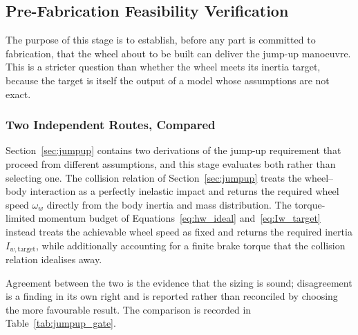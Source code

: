 \subsection{Pre-Fabrication Feasibility Verification}
\label{sec:test_feasibility}

The purpose of this stage is to establish, before any part is committed to
fabrication, that the wheel about to be built can deliver the jump-up manoeuvre.
This is a stricter question than whether the wheel meets its inertia target,
because the target is itself the output of a model whose assumptions are not
exact.

\subsubsection{Two Independent Routes, Compared}

Section~\ref{sec:jumpup} contains two derivations of the jump-up requirement that
proceed from different assumptions, and this stage evaluates both rather than
selecting one. The collision relation of Section~\ref{sec:jumpup} treats the
wheel--body interaction as a perfectly inelastic impact and returns the required
wheel speed $\omega_w$ directly from the body inertia and mass distribution. The
torque-limited momentum budget of Equations~\eqref{eq:hw_ideal}
and~\eqref{eq:Iw_target} instead treats the achievable wheel speed as fixed and
returns the required inertia $I_{w,\text{target}}$, while additionally accounting
for a finite brake torque that the collision relation idealises away.

Agreement between the two is the evidence that the sizing is sound; disagreement
is a finding in its own right and is reported rather than reconciled by choosing
the more favourable result. The comparison is recorded in
Table~\ref{tab:jumpup_gate}.

